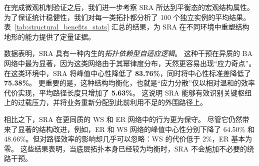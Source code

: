 \documentclass[journal]{IEEEtran}
\theoremstyle{plain}
\theoremstyle{definition}
\begin{document}
\begin{table}[h!]
\centering
\caption{SRA 结构优化收益分析（100 次运行的均值 $\pm$ 标准差）}
\label{tab:structural_benefits_stats}
\end{table}

在完成微观机制验证之后，我们进一步考察 SRA 所达到平衡态的宏观结构属性。
为了保证统计稳健性，我们对每一类拓扑都分析了 100 个独立实例的平均结果。
表~\ref{tab:structural_benefits_stats} 汇总的结果，为 SRA 在不同环境中重塑结构地形的能力提供了定量证据。

数据表明，SRA 具有一种内生的\textit{拓扑依赖型自适应逻辑}。
这种干预在异质的 BA 网络中最为显著，因为这类网络由于其幂律度分布，天然更容易出现“应力奇点”。
在这类环境中，SRA 将峰值中心性降低了 \textbf{83.76\%}，同时将中心性标准差降低了 \textbf{75.38\%}。
更重要的是，这种结构均衡化，也就是“应力分散”仅以相对温和的效率代价实现，平均路径长度只增加了 \textbf{5.63\%}。
这说明 SRA 能够有效识别关键枢纽上的过载压力，并将业务重新分配到此前利用不足的外围路径上。

相比之下，SRA 在更同质的 WS 和 ER 网络中的行为更为保守。
尽管它仍然带来了显著的结构改进，例如，ER 和 WS 网络的峰值中心性分别下降了 64.50\% 和 48.66\%。但对路径效率的影响却几乎可以忽略：WS 的代价低于 2\%，ER 基本为零。
这些结果表明，当底层拓扑本身已经较为均衡时，SRA 不会施加不必要的绕路干预。
\end{document}
